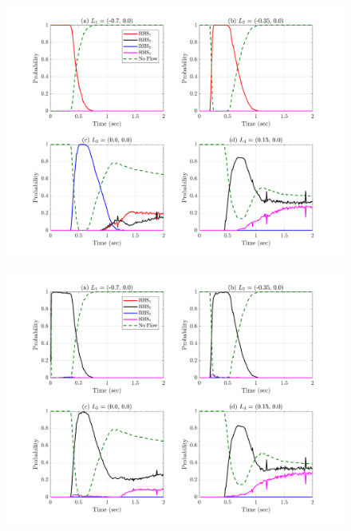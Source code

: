 \documentclass{article}
\begin{document}
\begin{figure}[H]
        \centering
        \includegraphics[width=1\textwidth]{InclinedPlane/Dominance1/DominancePX.png}
        \caption{}
        \label{fig:Ramp-FDominance1-PX}
\end{figure}

\begin{figure}[H]
        \centering
        \includegraphics[width=1\textwidth]{InclinedPlane/Dominance1/DominancePY.png}
        \caption{}
        \label{fig:Ramp-FDominance1-PY}
\end{figure}
\end{document}
